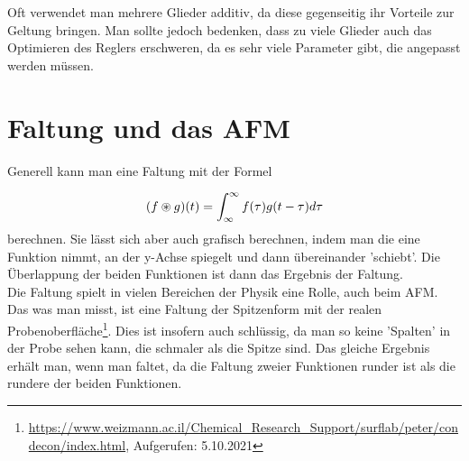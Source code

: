 Oft verwendet man mehrere Glieder additiv, da diese gegenseitig ihr Vorteile zur Geltung bringen. Man sollte jedoch bedenken, dass zu viele Glieder auch das 
Optimieren des Reglers erschweren, da es sehr viele Parameter gibt, die angepasst werden müssen.


\section{Faltung und das AFM}

Generell kann man eine Faltung mit der Formel 

\begin{equation*}
    (f \circledast g)(t) = \int_{\-\infty}^\infty f(\tau)g(t-\tau) d\tau
\end{equation*}
berechnen. Sie lässt sich aber auch grafisch berechnen, indem man die eine Funktion nimmt, an der y-Achse spiegelt und dann übereinander 'schiebt'. 
Die Überlappung der beiden Funktionen ist dann das Ergebnis der Faltung. \\

Die Faltung spielt in vielen Bereichen der Physik eine Rolle, auch beim AFM. Das was man misst, ist eine Faltung der Spitzenform mit der realen Probenoberfläche\footnote{\url{https://www.weizmann.ac.il/Chemical_Research_Support/surflab/peter/condecon/index.html}, Aufgerufen: 5.10.2021}. 
Dies ist insofern auch schlüssig, da man so keine 'Spalten' in der Probe sehen kann, die schmaler als die Spitze sind. Das gleiche Ergebnis erhält man, wenn man faltet, da die Faltung 
zweier Funktionen runder ist als die rundere der beiden Funktionen.